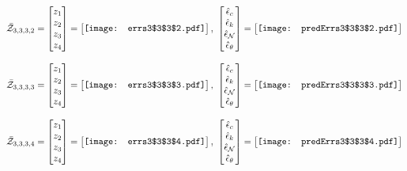 \documentclass[12pt]{article}
\begin{document}
\begin{gather*}
\bar{\mathcal{Z}}_{3,3,3,2}=\begin{bmatrix}
z_1\\
z_2\\
z_3\\
z_4
 \end{bmatrix}= \begin{bmatrix}
\vcenter{\hbox{\texttt{[image: errs3\$3\$3\$2.pdf]}}}
 \end{bmatrix},\,\, \begin{bmatrix}
\hat{\epsilon}_c\\\hat{\epsilon}_k\\\hat{\epsilon}_\mathcal{N}\\\hat{\epsilon}_\theta
 \end{bmatrix}=\begin{bmatrix}
\vcenter{\hbox{\texttt{[image: predErrs3\$3\$3\$2.pdf]}}}
 \end{bmatrix}
\end{gather*}


\begin{gather*}
\bar{\mathcal{Z}}_{3,3,3,3}=\begin{bmatrix}
z_1\\
z_2\\
z_3\\
z_4
 \end{bmatrix}= \begin{bmatrix}
\vcenter{\hbox{\texttt{[image: errs3\$3\$3\$3.pdf]}}}
 \end{bmatrix},\,\, \begin{bmatrix}
\hat{\epsilon}_c\\\hat{\epsilon}_k\\\hat{\epsilon}_\mathcal{N}\\\hat{\epsilon}_\theta
 \end{bmatrix}=\begin{bmatrix}
\vcenter{\hbox{\texttt{[image: predErrs3\$3\$3\$3.pdf]}}}
 \end{bmatrix}
\end{gather*}


\begin{gather*}
\bar{\mathcal{Z}}_{3,3,3,4}=\begin{bmatrix}
z_1\\
z_2\\
z_3\\
z_4
 \end{bmatrix}= \begin{bmatrix}
\vcenter{\hbox{\texttt{[image: errs3\$3\$3\$4.pdf]}}}
 \end{bmatrix},\,\, \begin{bmatrix}
\hat{\epsilon}_c\\\hat{\epsilon}_k\\\hat{\epsilon}_\mathcal{N}\\\hat{\epsilon}_\theta
 \end{bmatrix}=\begin{bmatrix}
\vcenter{\hbox{\texttt{[image: predErrs3\$3\$3\$4.pdf]}}}
 \end{bmatrix}
\end{gather*}
\end{document}
